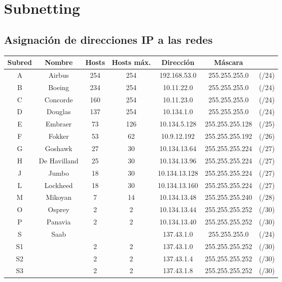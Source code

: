 \documentclass[12pt,a4paper,spanish]{article}
\begin{document}

\newpage
\tableofcontents
\newpage

\section{Subnetting}
\subsection{Asignación de direcciones IP a las redes}
\begin{tabular}{|c|c|c|c|c|c c|}
	\hline
	Subred & Nombre 	& Hosts 	& Hosts máx. & Dirección 	& Máscara & \\
	\hline
	\hline
	A & Airbus 	& 254 & 254 & 192.168.53.0 	& 255.255.255.0 & (/24) \\
	\hline
	B & Boeing 	& 234 & 254 & 10.11.22.0 	& 255.255.255.0 & (/24) \\
	\hline
	C & Concorde & 160 & 254 & 10.11.23.0 	& 255.255.255.0 & (/24) \\
	\hline
	D & Douglas 	& 137 & 254 & 10.134.1.0 	& 255.255.255.0 & (/24) \\
	\hline
	E & Embraer 	& 73 & 126 & 10.134.5.128 	& 255.255.255.128 & (/25) \\
	\hline
	F & Fokker 	& 53 & 62 & 10.9.12.192 		& 255.255.255.192 & (/26) \\
	\hline
	G & Goshawk 	& 27 & 30 & 10.134.13.64 	& 255.255.255.224 & (/27) \\
	\hline
	H & De Havilland & 25 & 30 & 10.134.13.96 & 255.255.255.224 & (/27) \\
	\hline
	J & Jumbo 	& 18 & 30 & 10.134.13.128 	& 255.255.255.224 & (/27) \\
	\hline
	L & Lockheed & 18 & 30 & 10.134.13.160 	& 255.255.255.224 & (/27) \\
	\hline
	M & Mikoyan 	& 7 & 14 & 10.134.13.48 	& 255.255.255.240 & (/28) \\
	\hline
	O & Osprey 	& 2 & 2 & 10.134.13.44 	& 255.255.255.252 & (/30) \\
	\hline
	P & Panavia 	& 2 & 2 & 10.134.13.40 	& 255.255.255.252 & (/30) \\
	\hline
	S & Saab 	& & 		& 137.43.1.0 	& 255.255.255.0 & (/24) \\
	\hline
	S1 & 		& 2 & 2 & 137.43.1.0 	& 255.255.255.252 & (/30) \\
	\hline
	S2 & 		& 2 & 2 & 137.43.1.4 	& 255.255.255.252 & (/30) \\
	\hline
	S3 & 		& 2 & 2 & 137.43.1.8 	& 255.255.255.252 & (/30) \\

\end{tabular}
\end{document}
